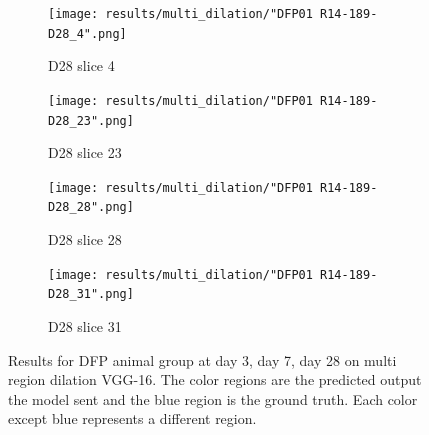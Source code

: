 \begin{figure}[!htb]
\medskip
\begin{subfigure}{0.25\textwidth}
  \texttt{[image: results/multi\_dilation/"DFP01 R14-189-D28\_4".png]}
  \caption{D28 slice 4}
\end{subfigure}\hfil %
\begin{subfigure}{0.25\textwidth}
  \texttt{[image: results/multi\_dilation/"DFP01 R14-189-D28\_23".png]}
  \caption{D28 slice 23}
\end{subfigure}\hfil %
\begin{subfigure}{0.25\textwidth}
  \texttt{[image: results/multi\_dilation/"DFP01 R14-189-D28\_28".png]}
  \caption{D28 slice 28}
\end{subfigure}\hfil %
\begin{subfigure}{0.25\textwidth}
  \texttt{[image: results/multi\_dilation/"DFP01 R14-189-D28\_31".png]}
  \caption{D28 slice 31}
\end{subfigure}
  
  \caption{Results for DFP animal group at day 3, day 7, day 28 on multi region dilation VGG-16. The color regions are the predicted output the model sent and the blue region is the ground truth. Each color except blue represents a different region.}
  \label{fig:results_multi_dilation_DFP}
\end{figure}




